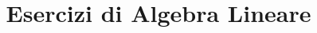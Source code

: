 \documentclass[italian,oneside,headinclude,11pt]{scrreprt}
\begin{document}
\title{Esercizi di Algebra Lineare}
\maketitle

\tableofcontents

% 





\end{document}
